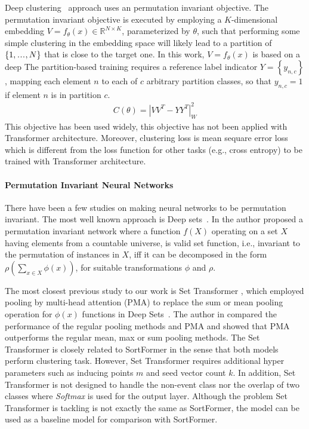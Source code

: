 \documentclass{article}
\newcommand\sdots{\makebox[1em][c]{.\hfil.\hfil.}}
\begin{document}
Deep clustering~\cite{hershey2016deep} approach uses an permutation invariant objective.
The permutation invariant objective is executed by employing a $K$-dimensional embedding $V=f_\theta(x) \in \mathbb{R}^{N \times K}$, parameterized by $\theta$, such that performing some
simple clustering in the embedding space will likely lead to a partition of $\{1, \sdots, N\}$ that is close to the target one. In this work, $V=f_\theta(x)$ is based on a deep
The partition-based training requires a reference label indicator $Y=\left\{y_{n, c}\right\}$, mapping each element $n$ to each of $c$ arbitrary partition classes, so that $y_{n, c}=1$
if element $n$ is in partition $c$.
\begin{align}
  C(\theta)=\left|V V^T-Y Y^T\right|_W^2
\end{align}
This objective has been used widely, this objective has not been applied with Transformer architecture.
Moreover, clustering loss is mean sequare error loss which is different from the loss function for other tasks (e.g., cross entropy) to be trained with Transformer architecture.


\paragraph{Permutation Invariant Neural Networks}
There have been a few studies on making neural networks to be permutation invariant. The most well known approach is Deep sets~\cite{zaheer2017deep}.
In \cite{zaheer2017deep} the author proposed a permutation invariant network where a function $f(X)$ operating on a set $X$ having elements from a countable universe, is valid set function,
i.e., invariant to the permutation of instances in $X$,
iff it can be decomposed in the form $\rho\left(\sum_{x \in X} \phi(x)\right)$, for suitable transformations $\phi$ and $\rho$.

The most closest previous study to our work is Set Transformer \cite{lee2019set}, which employed pooling by multi-head attention (PMA)
to replace the sum or mean pooling operation for $\phi(x)$ functions in Deep Sets~\cite{zaheer2017deep}.
The author in \cite{lee2019set} compared the performance of the regular pooling methods and PMA and showed that PMA outperforms the regular mean, max or sum pooling methods.
The Set Transformer is closely related to SortFormer in the sense that both models perform clustering task.
However, Set Transformer requires additional hyper parameters such as inducing points $m$ and seed vector count $k$.
In addition, Set Transformer is not designed to handle the non-event class nor the overlap of two classes where \textit{Softmax} is used for the output layer.
Although the problem Set Transformer is tackling is not exactly the same as SortFormer, the model can be used as a baseline model for comparison with SortFormer.
\end{document}
